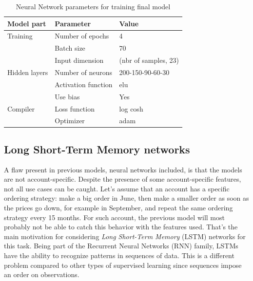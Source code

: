 \begin{table}[h]
    \centering
    \begin{tabular}{l|l|l}
        \textbf{Model part}           & \textbf{Parameter}                 & \textbf{Value}         \\ \hline
        Training                      & Number of epochs                   & 4                     \\
                                      & Batch size                         & 70             \\
                                      & Input dimension                    & (nbr of samples, 23)                     \\ \hline
        Hidden layers                 & Number of neurons                  & 200-150-90-60-30                     \\
                                      & Activation function                & elu                     \\
                                      & Use bias                           & Yes                     \\ \hline
        Compiler                      & Loss function                      & log cosh \\
                                      & Optimizer                          & adam
    \end{tabular}
    \caption{Neural Network parameters for training final model}
    \label{tab:nn-final-parameters}
\end{table}


\subsection{Long Short-Term Memory networks}
A flaw present in previous models, neural networks included, is that the models are not account-specific. Despite the presence of some account-specific features, not all use cases can be caught. Let's assume that an account has a specific ordering strategy: make a big order in June, then make a smaller order as soon as the prices go down, for example in September, and repeat the same ordering strategy every 15 months. For such account, the previous model will most probably not be able to catch this behavior with the features used. That's the main motivation for considering \textit{Long Short-Term Memory} (LSTM) networks for this task. Being part of the Recurrent Neural Networks (RNN) family, LSTMs have the ability to recognize patterns in sequences of data. This is a different problem compared to other types of supervised learning since sequences impose an order on observations.

